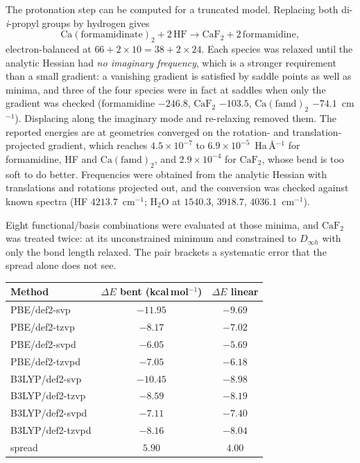 The protonation step can be computed for a truncated model. Replacing both
di-\emph{i}-propyl groups by hydrogen gives
\[
\mathrm{Ca(formamidinate)_2} + 2\,\mathrm{HF}
 \longrightarrow \mathrm{CaF_2} + 2\,\mathrm{formamidine},
\]
electron-balanced at $66 + 2\times10 = 38 + 2\times24$. Each species was relaxed
until the analytic Hessian had \emph{no imaginary frequency}, which is a stronger
requirement than a small gradient: a vanishing gradient is satisfied by saddle
points as well as minima, and three of the four species were in fact at saddles
when only the gradient was checked (formamidine $-246.8$, $\mathrm{CaF_2}$ $-103.5$,
$\mathrm{Ca(famd)_2}$ $-74.1$~cm$^{-1}$). Displacing along the imaginary mode and
re-relaxing removed them. The reported energies are at geometries converged on the
rotation- and translation-projected gradient, which reaches
$4.5\times10^{-7}$ to $6.9\times10^{-5}$~Ha\,\AA$^{-1}$ for formamidine, HF and
$\mathrm{Ca(famd)_2}$, and $2.9\times10^{-4}$ for $\mathrm{CaF_2}$, whose bend is too
soft to do better. Frequencies were obtained from the analytic
Hessian with translations and rotations projected out, and the conversion was
checked against known spectra (HF $4213.7$~cm$^{-1}$; H$_2$O at $1540.3$,
$3918.7$, $4036.1$~cm$^{-1}$).

Eight functional/basis combinations were evaluated at those minima, and
$\mathrm{CaF_2}$ was treated twice: at its unconstrained minimum and constrained to
$D_{\infty h}$ with only the bond length relaxed. The pair brackets a systematic
error that the spread alone does not see.

\begin{center}
\begin{tabular}{lcc}
\hline
Method & $\Delta E$ bent (kcal\,mol$^{-1}$) & $\Delta E$ linear \\
\hline
PBE/def2-svp     & $-11.95$ & $-9.69$ \\
PBE/def2-tzvp    & $-8.17$  & $-7.02$ \\
PBE/def2-svpd    & $-6.05$  & $-5.69$ \\
PBE/def2-tzvpd   & $-7.05$  & $-6.18$ \\
B3LYP/def2-svp   & $-10.45$ & $-8.98$ \\
B3LYP/def2-tzvp  & $-8.59$  & $-8.19$ \\
B3LYP/def2-svpd  & $-7.11$  & $-7.40$ \\
B3LYP/def2-tzvpd & $-8.16$  & $-8.04$ \\
\hline
spread & $5.90$ & $4.00$ \\
\hline
\end{tabular}
\end{center}

